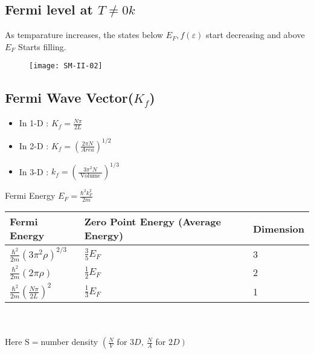 \subsection{Fermi level at $T \neq 0 k$}
As temparature increases, the states below $E_{F}, f(\varepsilon)$ start decreasing and above $E_{F}$ Starts filling.
\begin{figure}[H]
	\centering
	\texttt{[image: SM-II-02]}
\end{figure}
\subsection{Fermi Wave Vector($K_f$)}
\begin{itemize}
	\item In 1-D : $K_{f}=\frac{N \pi}{2 L}$
	\item  In 2-D : $K_{f}=\left(\frac{2 \pi N}{Are a}\right)^{1 / 2}$
	\item  In 3-D : $k_{f}=\left(\frac{3 \pi^{2} N}{\text { Volume }}\right)^{1 / 3}$
\end{itemize}
Fermi Energy $E_{F}=\frac{\hbar^{2} k_{F}^{2}}{2 m}$\\
\renewcommand*{\arraystretch}{2}
\begin{tabular}{|p{4cm}|p{4cm}|p{3cm}|}
	\hline
	Fermi Energy&Zero Point Energy (Average Energy)&Dimension\\\hline
	$\frac{\hbar^{2}}{2 m}\left(3 \pi^{2} \rho\right)^{2 / 3}$&$\frac{3}{5} E_{F}$&3\\
	$\frac{\hbar^{2}}{2 m}(2 \pi \rho)$&$\frac{1}{2} E_{F}$&2\\
	$\frac{\hbar^{2}}{2 m}\left(\frac{N \pi}{2 L}\right)^{2}$&$\frac{1}{3} E_{F}$& 1\\\hline
\end{tabular}\\\\
Here $\mathrm{S}=$number density $\left(\frac{N}{V}\right.$ for $3 D ,\ \frac{N}{A}$ for $\left.2 D\right)$

